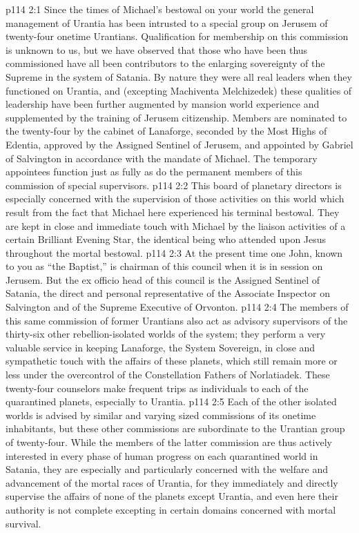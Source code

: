 \vs p114 2:1 Since the times of Michael’s bestowal on your world the general management of Urantia has been intrusted to a special group on Jerusem of twenty\hyp{}four onetime Urantians. Qualification for membership on this commission is unknown to us, but we have observed that those who have been thus commissioned have all been contributors to the enlarging sovereignty of the Supreme in the system of Satania. By nature they were all real leaders when they functioned on Urantia, and (excepting Machiventa Melchizedek) these qualities of leadership have been further augmented by mansion world experience and supplemented by the training of Jerusem citizenship. Members are nominated to the twenty\hyp{}four by the cabinet of Lanaforge, seconded by the Most Highs of Edentia, approved by the Assigned Sentinel of Jerusem, and appointed by Gabriel of Salvington in accordance with the mandate of Michael. The temporary appointees function just as fully as do the permanent members of this commission of special supervisors.
\vs p114 2:2 This board of planetary directors is especially concerned with the supervision of those activities on this world which result from the fact that Michael here experienced his terminal bestowal. They are kept in close and immediate touch with Michael by the liaison activities of a certain Brilliant Evening Star, the identical being who attended upon Jesus throughout the mortal bestowal.
\vs p114 2:3 At the present time one John, known to you as “the Baptist,” is chairman of this council when it is in session on Jerusem. But the ex officio head of this council is the Assigned Sentinel of Satania, the direct and personal representative of the Associate Inspector on Salvington and of the Supreme Executive of Orvonton.
\vs p114 2:4 The members of this same commission of former Urantians also act as advisory supervisors of the thirty\hyp{}six other rebellion\hyp{}isolated worlds of the system; they perform a very valuable service in keeping Lanaforge, the System Sovereign, in close and sympathetic touch with the affairs of these planets, which still remain more or less under the overcontrol of the Constellation Fathers of Norlatiadek. These twenty\hyp{}four counselors make frequent trips as individuals to each of the quarantined planets, especially to Urantia.
\vs p114 2:5 Each of the other isolated worlds is advised by similar and varying sized commissions of its onetime inhabitants, but these other commissions are subordinate to the Urantian group of twenty\hyp{}four. While the members of the latter commission are thus actively interested in every phase of human progress on each quarantined world in Satania, they are especially and particularly concerned with the welfare and advancement of the mortal races of Urantia, for they immediately and directly supervise the affairs of none of the planets except Urantia, and even here their authority is not complete excepting in certain domains concerned with mortal survival.
